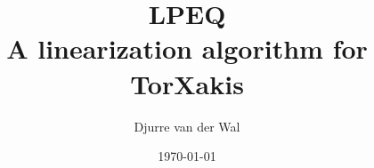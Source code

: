 \documentclass{report}%
\newcommand{\txs}{TorXakis}
\begin{document}
\title{LPEQ\\\large{A linearization algorithm for \txs{}}}
\author{Djurre van der Wal}
\date{\today}
\maketitle
\tableofcontents


%

%



\end{document}

